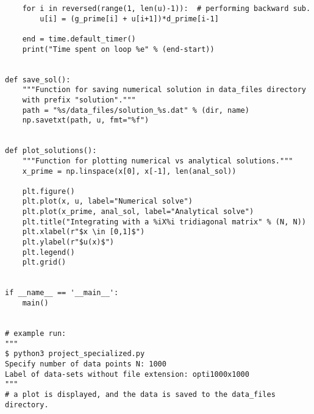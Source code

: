 \documentclass[english,notitlepage]{revtex4-1}  %
\begin{document}
\begin{lstlisting}
    for i in reversed(range(1, len(u)-1)):  # performing backward sub.
        u[i] = (g_prime[i] + u[i+1])*d_prime[i-1]

    end = time.default_timer()
    print("Time spent on loop %e" % (end-start))


def save_sol():
    """Function for saving numerical solution in data_files directory
    with prefix "solution"."""
    path = "%s/data_files/solution_%s.dat" % (dir, name)
    np.savetxt(path, u, fmt="%f")


def plot_solutions():
    """Function for plotting numerical vs analytical solutions."""
    x_prime = np.linspace(x[0], x[-1], len(anal_sol))

    plt.figure()
    plt.plot(x, u, label="Numerical solve")
    plt.plot(x_prime, anal_sol, label="Analytical solve")
    plt.title("Integrating with a %iX%i tridiagonal matrix" % (N, N))
    plt.xlabel(r"$x \in [0,1]$")
    plt.ylabel(r"$u(x)$")
    plt.legend()
    plt.grid()


if __name__ == '__main__':
    main()


# example run:
"""
$ python3 project_specialized.py
Specify number of data points N: 1000
Label of data-sets without file extension: opti1000x1000
"""
# a plot is displayed, and the data is saved to the data_files directory.

\end{lstlisting}
\end{document}
